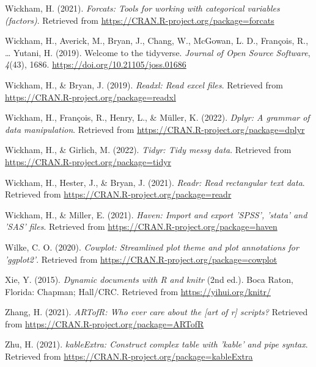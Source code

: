 \documentclass[
  man]{apa6}
\newlength{\cslhangindent}
\newlength{\cslentryspacingunit} %
\newenvironment{CSLReferences}[2] %
 {%
  \setlength{\parindent}{0pt}
  \ifodd #1
  \let\oldpar\par
  \def\par{\hangindent=\cslhangindent\oldpar}
  \fi
  \setlength{\parskip}{#2\cslentryspacingunit}
 }%
 {}
\begin{document}
\begin{CSLReferences}{1}{0}
\leavevmode{}%
Wickham, H. (2021). \emph{Forcats: Tools for working with categorical variables (factors)}. Retrieved from \url{https://CRAN.R-project.org/package=forcats}

\leavevmode{}%
Wickham, H., Averick, M., Bryan, J., Chang, W., McGowan, L. D., François, R., \ldots{} Yutani, H. (2019). Welcome to the {tidyverse}. \emph{Journal of Open Source Software}, \emph{4}(43), 1686. \url{https://doi.org/10.21105/joss.01686}

\leavevmode{}%
Wickham, H., \& Bryan, J. (2019). \emph{Readxl: Read excel files}. Retrieved from \url{https://CRAN.R-project.org/package=readxl}

\leavevmode{}%
Wickham, H., François, R., Henry, L., \& Müller, K. (2022). \emph{Dplyr: A grammar of data manipulation}. Retrieved from \url{https://CRAN.R-project.org/package=dplyr}

\leavevmode{}%
Wickham, H., \& Girlich, M. (2022). \emph{Tidyr: Tidy messy data}. Retrieved from \url{https://CRAN.R-project.org/package=tidyr}

\leavevmode{}%
Wickham, H., Hester, J., \& Bryan, J. (2021). \emph{Readr: Read rectangular text data}. Retrieved from \url{https://CRAN.R-project.org/package=readr}

\leavevmode{}%
Wickham, H., \& Miller, E. (2021). \emph{Haven: Import and export 'SPSS', 'stata' and 'SAS' files}. Retrieved from \url{https://CRAN.R-project.org/package=haven}

\leavevmode{}%
Wilke, C. O. (2020). \emph{Cowplot: Streamlined plot theme and plot annotations for 'ggplot2'}. Retrieved from \url{https://CRAN.R-project.org/package=cowplot}

\leavevmode{}%
Xie, Y. (2015). \emph{Dynamic documents with {R} and knitr} (2nd ed.). Boca Raton, Florida: Chapman; Hall/CRC. Retrieved from \url{https://yihui.org/knitr/}

\leavevmode{}%
Zhang, H. (2021). \emph{ARTofR: Who ever care about the {[}art of r{]} scripts?} Retrieved from \url{https://CRAN.R-project.org/package=ARTofR}

\leavevmode{}%
Zhu, H. (2021). \emph{kableExtra: Construct complex table with 'kable' and pipe syntax}. Retrieved from \url{https://CRAN.R-project.org/package=kableExtra}

\end{CSLReferences}

\endgroup


\clearpage
\renewcommand{\listtablename}{Table captions}
\end{document}
